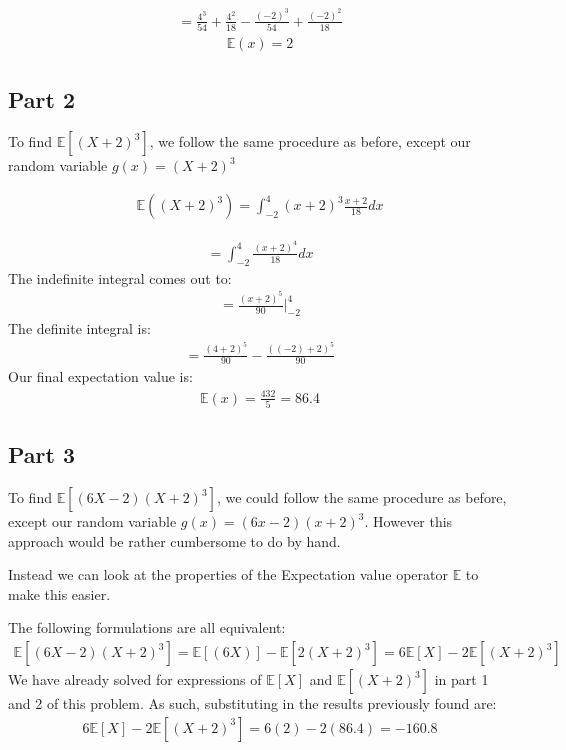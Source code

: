\documentclass{article}
\begin{document}
\begin{align*}
=\frac{4^3}{54}+\frac{4^2}{18} - \frac{(-2)^3}{54}+\frac{(-2)^2}{18}
\end{align*}
\begin{align*}
\boxed{\mathbb{E}(x)=2} 
\end{align*}
\subsection*{Part 2}
To find $\mathbb{E}[(X+2)^3]$, we follow the same procedure as before, except our random variable $g(x)=(X+2)^3$

\begin{align*}
\mathbb{E}((X+2)^3)=\int_{-2}^{4} (x+2)^3 \tfrac{x+2}{18} dx
\end{align*}

\begin{align*}
=\int_{-2}^{4} \tfrac{(x+2)^4}{18} dx
\end{align*}
The indefinite integral comes out to:
\begin{align*}
= \frac{(x+2)^5}{90} |_{-2}^{4}
\end{align*}
The definite integral is:
\begin{align*}
= \frac{(4+2)^5}{90} - \frac{((-2)+2)^5}{90}
\end{align*}
Our final expectation value is:
\begin{align*}
\boxed{\mathbb{E}(x)=\frac{432}{5} = 86.4} 
\end{align*}

\subsection*{Part 3}
To find $\mathbb{E}[(6X-2)(X+2)^3]$, we could follow the same procedure as before, except our random variable $g(x)=(6x-2)(x+2)^3$. However this approach would be rather cumbersome to do by hand.

Instead we can look at the properties of the Expectation value operator $\mathbb{E}$ to make this easier.

The following formulations are all equivalent:
\begin{align*}
\mathbb{E}[(6X-2)(X+2)^3]= \mathbb{E}[(6X)] - \mathbb{E}[2(X+2)^3] = 6\mathbb{E}[X] - 2\mathbb{E}[(X+2)^3]
\end{align*}
We have already solved for expressions of $\mathbb{E}[X]$ and $\mathbb{E}[(X+2)^3]$ in part 1 and 2 of this problem. As such, substituting in the results previously found are:
\begin{align*}
\boxed{6\mathbb{E}[X] - 2\mathbb{E}[(X+2)^3] = 6(2) - 2(86.4) = -160.8}
\end{align*}
\end{document}
